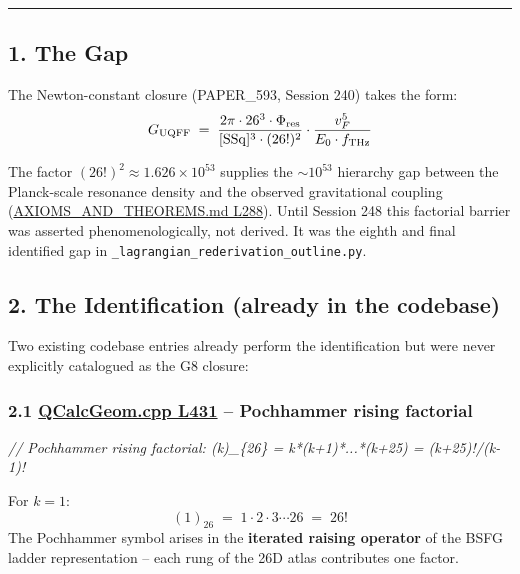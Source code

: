 \documentclass[
]{article}
\newenvironment{Shaded}{}{}
\newcommand{\CommentTok}[1]{\textcolor[rgb]{0.38,0.63,0.69}{\textit{#1}}}
\begin{document}
\begin{center}\rule{0.5\linewidth}{0.5pt}\end{center}

\subsection{1. The Gap}\label{the-gap}

The Newton-constant closure (PAPER\_593, Session 240) takes the form:
\[G_{\rm UQFF} \;=\; \frac{2\pi \cdot 26^3 \cdot \Phi_{\rm res}}{[\mathrm{SSq}]^3 \cdot (26!)^2} \cdot \frac{v_F^5}{E_0 \cdot f_{\rm THz}}\]

The factor \((26!)^2 \approx 1.626 \times 10^{53}\) supplies the
\(\sim 10^{53}\) hierarchy gap between the Planck-scale resonance
density and the observed gravitational coupling
(\href{AXIOMS_AND_THEOREMS.md\#L288}{AXIOMS\_AND\_THEOREMS.md L288}).
Until Session 248 this factorial barrier was asserted
phenomenologically, not derived. It was the eighth and final identified
gap in \texttt{\_lagrangian\_rederivation\_outline.py}.

\subsection{2. The Identification (already in the
codebase)}\label{the-identification-already-in-the-codebase}

Two existing codebase entries already perform the identification but
were never explicitly catalogued as the G8 closure:

\subsubsection{\texorpdfstring{2.1
\href{QCalcGeom.cpp\#L431}{QCalcGeom.cpp L431} -- Pochhammer rising
factorial}{2.1 QCalcGeom.cpp L431 -- Pochhammer rising factorial}}\label{qcalcgeom.cpp-l431-pochhammer-rising-factorial}

\begin{Shaded}
\begin{Highlighting}[]
\CommentTok{// Pochhammer rising factorial: (k)\_\{26\} = k*(k+1)*...*(k+25) = (k+25)!/(k{-}1)!}
\end{Highlighting}
\end{Shaded}

For \(k = 1\): \[(1)_{26} \;=\; 1 \cdot 2 \cdot 3 \cdots 26 \;=\; 26!\]
The Pochhammer symbol arises in the \textbf{iterated raising operator}
of the BSFG ladder representation -- each rung of the 26D atlas
contributes one factor.
\end{document}
